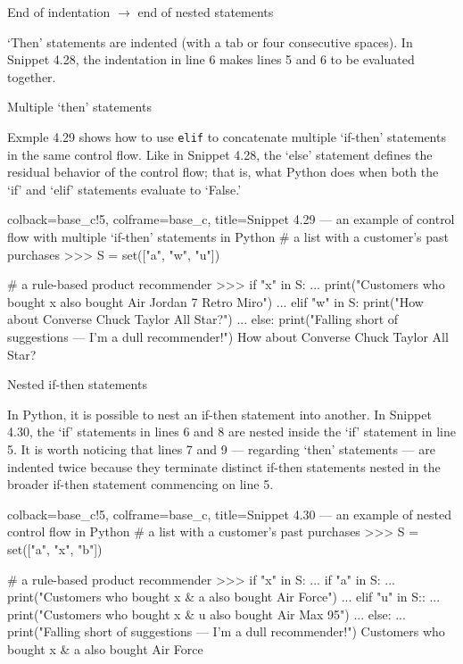 \documentclass[a4paper,11pt]{book}
\numberwithin{figure}{chapter}
\numberwithin{table}{chapter}
\newcommand{\question}[1]{%
    \begin{tcolorbox}[colback=comp_c!10,colframe=comp_c,sidebyside align=top,width=\linewidth,before skip=1ex]
        #1
    \end{tcolorbox}%
    \switchcolumn%
}
\newcommand{\note}[1]{%
    \begin{tcolorbox}[colback=white!0,colframe=white!10,width=\linewidth,before skip=1ex]
        #1
    \end{tcolorbox}         
}
\begin{document}
\begin{paracol}{2}
	\question{\raggedright End of indentation $\rightarrow$ end of nested statements}
	\note{`Then' statements are indented (with a tab or four consecutive spaces). In Snippet 4.28, the indentation in line 6 makes lines 5 and 6 to be evaluated together.}
\end{paracol}

\begin{paracol}{2}
\question{\raggedright Multiple `then' statements}
\note{Exmple 4.29 shows how to use \texttt{elif} to concatenate multiple `if-then' statements in the same control flow. Like in Snippet 4.28, the `else' statement defines the residual behavior of the control flow; that is, what Python does when both the `if' and `elif' statements evaluate to `False.'}
\end{paracol}

\begin{pythoncode}[linenos=true,]{colback=base_c!5, colframe=base_c, title=\sffamily Snippet 4.29 --- an example of control flow with multiple `if-then' statements in Python}
# a list with a customer's past purchases
>>> S = set(["a", "w", "u"])

# a rule-based product recommender 
>>> if "x" in S:
...     print("Customers who bought x also bought Air Jordan 7 Retro Miro")
... elif "w" in S:
	print("How about Converse Chuck Taylor All Star?")
... else:
	print("Falling short of suggestions --- I'm a dull recommender!")
How about Converse Chuck Taylor All Star?
\end{pythoncode}

\begin{paracol}{2}
\question{\raggedright Nested if-then statements}
\note{In Python, it is possible to nest an if-then statement into another. In Snippet 4.30, the `if' statements in lines 6 and 8 are nested inside the `if' statement in line 5. It is worth noticing that lines 7 and 9 --- regarding `then' statements --- are indented twice because they terminate distinct if-then statements nested in the broader if-then statement commencing on line 5.}
\end{paracol}

\begin{pythoncode}[linenos=true,]{colback=base_c!5, colframe=base_c, title=\sffamily Snippet 4.30 --- an example of nested control flow in Python}
# a list with a customer's past purchases
>>> S = set(["a", "x", "b"])

# a rule-based product recommender 
>>> if "x" in S:
...     if "a" in S:
...         print("Customers who bought x & a also bought Air Force")
...     elif "u" in S::
...         print("Customers who bought x & u also bought Air Max 95")
... else:
...    print("Falling short of suggestions --- I'm a dull recommender!") 
Customers who bought x & a also bought Air Force
\end{pythoncode}
\end{document}
